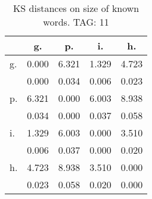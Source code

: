 \begin{table}[h!]
\begin{center}
\begin{tabular}{| l | c | c | c | c |}\hline
 & g. & p. & i. & h. \\\hline
g. & 0.000  & 6.321  & 1.329  & 4.723 \\\hline
 & 0.000  & 0.034  & 0.006  & 0.023 \\\hline
p. & 6.321  & 0.000  & 6.003  & 8.938 \\\hline
 & 0.034  & 0.000  & 0.037  & 0.058 \\\hline
i. & 1.329  & 6.003  & 0.000  & 3.510 \\\hline
 & 0.006  & 0.037  & 0.000  & 0.020 \\\hline
h. & 4.723  & 8.938  & 3.510  & 0.000 \\\hline
 & 0.023  & 0.058  & 0.020  & 0.000 \\\hline
\end{tabular}
\caption{KS distances on size of known words. TAG: 11}
\end{center}
\end{table}